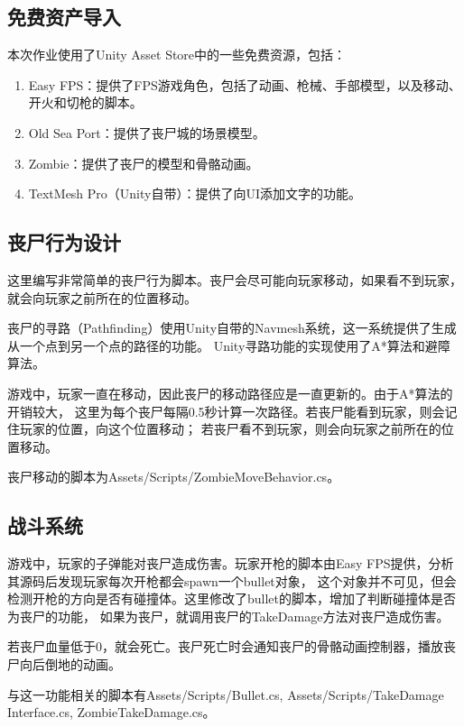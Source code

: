 \documentclass{article}
\begin{document}
\subsection{免费资产导入}

本次作业使用了Unity Asset Store中的一些免费资源，包括：

\begin{enumerate}
    \item Easy FPS：提供了FPS游戏角色，包括了动画、枪械、手部模型，以及移动、开火和切枪的脚本。
    \item Old Sea Port：提供了丧尸城的场景模型。
    \item Zombie：提供了丧尸的模型和骨骼动画。
    \item TextMesh Pro（Unity自带）：提供了向UI添加文字的功能。
\end{enumerate}

\subsection{丧尸行为设计}

这里编写非常简单的丧尸行为脚本。丧尸会尽可能向玩家移动，如果看不到玩家，就会向玩家之前所在的位置移动。

丧尸的寻路（Pathfinding）使用Unity自带的Navmesh系统，这一系统提供了生成从一个点到另一个点的路径的功能。
Unity寻路功能的实现使用了A*算法和避障算法。

游戏中，玩家一直在移动，因此丧尸的移动路径应是一直更新的。由于A*算法的开销较大，
这里为每个丧尸每隔0.5秒计算一次路径。若丧尸能看到玩家，则会记住玩家的位置，向这个位置移动；
若丧尸看不到玩家，则会向玩家之前所在的位置移动。

丧尸移动的脚本为Assets/Scripts/ZombieMoveBehavior.cs。

\subsection{战斗系统}

游戏中，玩家的子弹能对丧尸造成伤害。玩家开枪的脚本由Easy FPS提供，分析其源码后发现玩家每次开枪都会spawn一个bullet对象，
这个对象并不可见，但会检测开枪的方向是否有碰撞体。这里修改了bullet的脚本，增加了判断碰撞体是否为丧尸的功能，
如果为丧尸，就调用丧尸的TakeDamage方法对丧尸造成伤害。

若丧尸血量低于0，就会死亡。丧尸死亡时会通知丧尸的骨骼动画控制器，播放丧尸向后倒地的动画。

与这一功能相关的脚本有Assets/Scripts/Bullet.cs,
Assets/Scripts/TakeDamage Interface.cs,
ZombieTakeDamage.cs。
\end{document}
